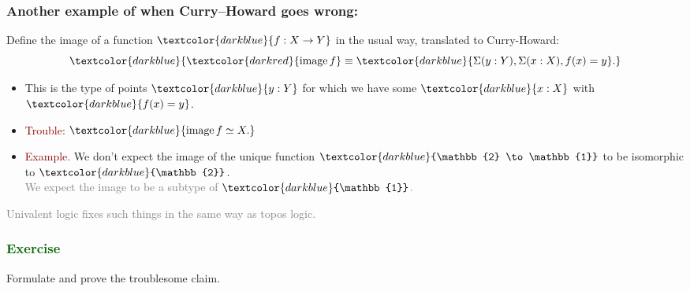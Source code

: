\documentclass[aspectratio=169]{beamer}
\newcommand{\image}{\operatorname{image}}
\newcommand{\eqq}{\equiv}
\newcommand{\db}{\textcolor{darkblue}}
\newcommand{\dg}{\textcolor{darkgreen}}
\newcommand{\grey}{\textcolor{grey}}
\newcommand{\dr}{\textcolor{darkred}}
\newcommand{\m}[1]{$\db{#1}$}
\newcommand{\M}[1]{\[\db{#1}\]}
\begin{document}
\begin{frame}
  \frametitle{Another example of when Curry--Howard goes wrong: }

Define the image of a function \m{f:X \to Y} in the usual way, translated to Curry-Howard:
\M{\dr{\image f} \eqq \db{\Sigma(y:Y), \Sigma(x:X), f(x)=y}.}

\begin{itemize}
\vfill \item 
This is the type of points \m{y:Y} for which we have some \m{x:X} with \m{f(x)=y}.
\vfill \item \dr{Trouble:} \m{\image f \simeq X.} \\[1ex]



\vfill \item \dr{Example.} We don't expect the image of the unique function \m{\mathbb{2} \to \mathbb{1}} to be isomorphic to \m{\mathbb{2}}. \\[1ex]

\grey{We expect the image to be a subtype of \m{\mathbb{1}}.} 


\end{itemize}

\vfill

\grey{Univalent logic fixes such things in the same way as topos logic.}

\end{frame}

\begin{frame}
  \frametitle{\dg{Exercise}}

  Formulate and prove the troublesome claim.
  
\end{frame}
\end{document}
